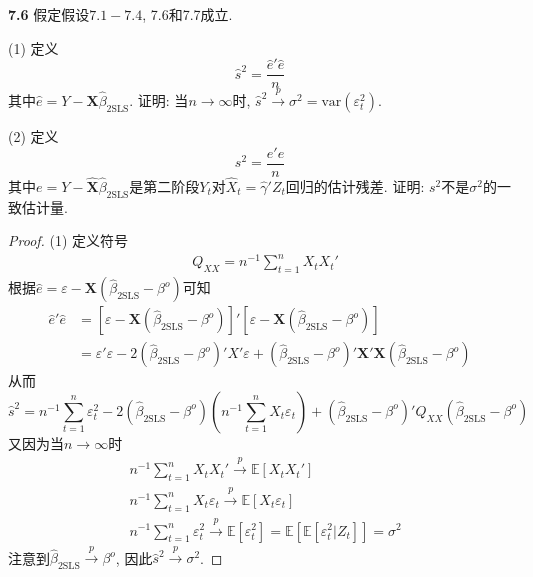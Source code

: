 \documentclass[cn,12pt,math=mtpro2,citestyle=gb7714-2015,bibstyle=gb7714-2015,twocol,mode=simple]{elegantbook}
\newcommand{\E}{\mathbb{E}}
\newcommand{\btls}{\hat{\beta}_{\text{2SLS}}}
\begin{document}
\textbf{7.6} 假定假设$7.1-7.4$, 7.6和7.7成立.

(1) 定义
$$\hat{s}^2=\frac{\hat{e}'\hat{e}}{n}$$
其中$\hat{e}=Y-\mathbf{X}\btls$. 证明: 当$n\to\infty$时, $\hat{s}^2\xrightarrow{p}\sigma^2=\text{var}(\varepsilon_t^2)$.

(2) 定义
$$s^2=\frac{e'e}{n}$$
其中$e=Y-\hat{\mathbf{X}}\btls$是第二阶段$Y_t$对$\hat{X}_t=\hat{\gamma}'Z_t$回归的估计残差. 证明: $s^2$不是$\sigma^2$的一致估计量.

\begin{proof}
  (1) 定义符号
  \begin{align*}
  & Q_{XX}=n^{-1}\sum_{t=1}^{n}X_tX_t'
  \end{align*}
  根据$\hat{e}=\varepsilon-\mathbf{X}(\btls-\beta^o)$可知
  \begin{align*}
  \hat{e}'\hat{e}&=[\varepsilon-\mathbf{X}(\btls-\beta^o)]'[\varepsilon-\mathbf{X}(\btls-\beta^o)]\\
  &=\varepsilon'\varepsilon-2(\btls-\beta^o)'X'\varepsilon+(\btls-\beta^o)'\mathbf{X}'\mathbf{X}(\btls-\beta^o)
  \end{align*}
  从而
  $$\hat{s}^2=n^{-1}\sum_{t=1}^{n}\varepsilon_t^2-2(\btls-\beta^o)\left(n^{-1}\sum_{t=1}^{n}X_t\varepsilon_t\right)+(\btls-\beta^o)'Q_{XX}(\btls-\beta^o)$$
  又因为当$n\to\infty$时
  \begin{align*}
  & n^{-1}\sum_{t=1}^{n}X_tX_t'\xrightarrow{p}\E[X_tX_t'] \\
  & n^{-1}\sum_{t=1}^{n}X_t\varepsilon_t\xrightarrow{p}\E[X_t\varepsilon_t] \\
  & n^{-1}\sum_{t=1}^{n}\varepsilon_t^2\xrightarrow{p}\E[\varepsilon_t^2]=\E[\E[\varepsilon_t^2|Z_t]]=\sigma^2
  \end{align*}
  注意到$\btls\xrightarrow{p}\beta^o$, 因此$\hat{s}^2\xrightarrow{p}\sigma^2$.


\end{proof}
\end{document}
